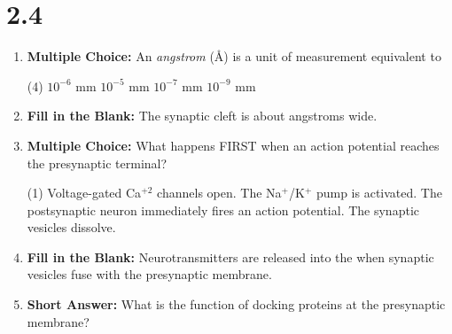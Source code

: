 \section*{2.4}
\begin{enumerate}[label=\textbf{Q2.4.\arabic*}]
      
      \item \textbf{Multiple Choice:} An \textit{angstrom} (\AA) is a unit of measurement equivalent to
      \begin{tasks}[label=(\Alph*), label-width=1.5em, item-indent=1.7em](4)
            \task \(10^{-6}\) mm
            \task \(10^{-5}\) mm
            \task \(10^{-7}\) mm
            \task \(10^{-9}\) mm
      \end{tasks}
      
      \item \textbf{Fill in the Blank:} The synaptic cleft is about \underline{\hspace{3cm}} angstroms wide. \\

      \item \textbf{Multiple Choice:} What happens FIRST when an action potential reaches the presynaptic terminal?
            \begin{tasks}[label=(\Alph*), label-width=1.5em, item-indent=1.7em](1)
                  \task Voltage-gated Ca\(^{+2}\) channels open.
                  \task The Na\(^+\)/K\(^+\) pump is activated.
                  \task The postsynaptic neuron immediately fires an action potential.
                  \task The synaptic vesicles dissolve.
            \end{tasks}

      \item \textbf{Fill in the Blank:} Neurotransmitters are released into the \underline{\hspace{3cm}} when synaptic vesicles fuse with the presynaptic membrane. \\

      \item \textbf{Short Answer:} What is the function of docking proteins at the presynaptic membrane? \\

            
            

\end{enumerate}

